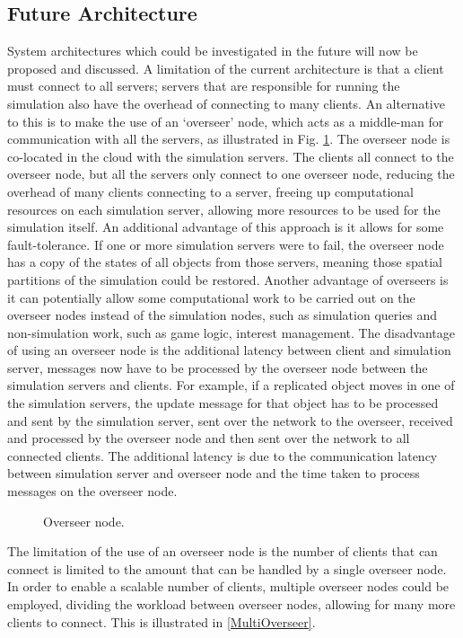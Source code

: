 \subsection{Future Architecture}
System architectures which could be investigated in the future will now be proposed and discussed. A limitation of the current architecture is that a client must connect to all servers; servers that are responsible for running the simulation also have the overhead of connecting to many clients. An alternative to this is to make the use of an `overseer' node, which acts as a middle-man for communication with all the servers, as illustrated in Fig. \ref{OverseerNode}. The overseer node is co-located in the cloud with the simulation servers. The clients all connect to the overseer node, but all the servers only connect to one overseer node, reducing the overhead of many clients connecting to a server, freeing up computational resources on each simulation server, allowing more resources to be used for the simulation itself. An additional advantage of this approach is it allows for some fault-tolerance. If one or more simulation servers were to fail, the overseer node has a copy of the states of all objects from those servers, meaning those spatial partitions of the simulation could be restored. Another advantage of overseers is it can potentially allow  some computational work to be carried out on the overseer nodes instead of the simulation nodes, such as simulation queries and non-simulation work, such as game logic, interest management.
The disadvantage of using an overseer node is the additional latency between client and simulation server, messages now have to be processed by the overseer node between the simulation servers and clients. For example, if a replicated object moves in one of the simulation servers, the update message for that object has to be processed and sent by the simulation server, sent over the network to the overseer, received and processed by the overseer node and then sent over the network to all connected clients. The additional latency is due to the communication latency between simulation server and overseer node and the time taken to process messages on the overseer node.

\begin{figure}
	\centering
	\scalebox{1.25}{}
	\caption{Overseer node.}
	\label{OverseerNode}
\end{figure}

The limitation of the use of an overseer node is the number of clients that can connect is limited to the amount that can be handled by a single overseer node. In order to enable a scalable number of clients, multiple overseer nodes could be employed, dividing the workload between overseer nodes, allowing for many more clients to connect. This is illustrated in \ref{MultiOverseer}.

